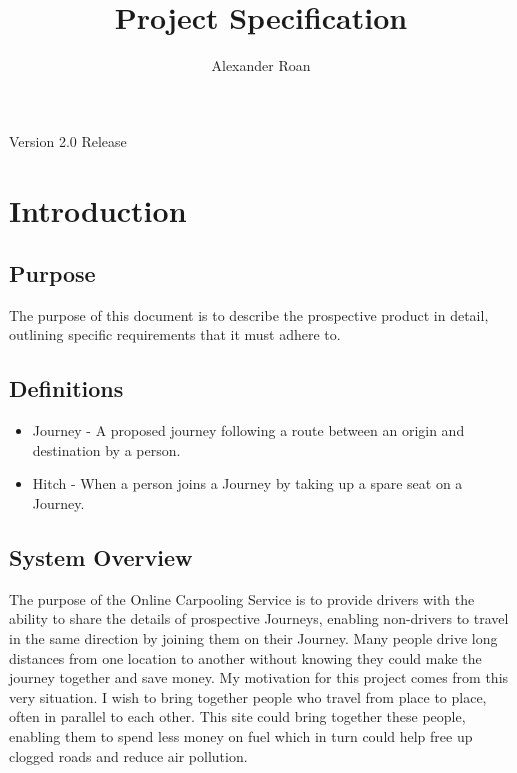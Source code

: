\documentclass[11pt]{article}
\begin{document}
\begin{titlepage}
\title{Project Specification}
\author{Alexander Roan}
\maketitle
\begin{center}
Version 2.0 Release
\end{center}
\end{titlepage}

\tableofcontents
\newpage
\section{Introduction}

\subsection{Purpose}
The purpose of this document is to describe the prospective product in detail, outlining specific requirements that it must adhere to.

\subsection{Definitions}
\begin{itemize}
\item Journey - A proposed journey following a route between an origin and destination by a person.
\item Hitch - When a person joins a Journey by taking up a spare seat on a Journey.
\end{itemize}

\subsection{System Overview}
The purpose of the Online Carpooling Service is to provide drivers with the ability to share the details of prospective Journeys, enabling non-drivers to travel in the same direction by joining them on their Journey. Many people drive long distances from one location to another without knowing they could make the journey together and save money. My motivation for this project comes from this very situation. I wish to bring together people who travel from place to place, often in parallel to each other. This site could bring together these people, enabling them to spend less money on fuel which in turn could help free up clogged roads and reduce air pollution.
\end{document}
